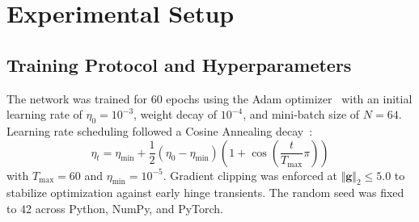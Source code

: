\documentclass[conference]{IEEEtran}
\begin{document}
\section{Experimental Setup}

\subsection{Training Protocol and Hyperparameters}
The network was trained for 60 epochs using the Adam optimizer~\cite{kingma2014adam} with an initial learning rate of $\eta_0 = 10^{-3}$, weight decay of $10^{-4}$, and mini-batch size of $N=64$. Learning rate scheduling followed a Cosine Annealing decay~\cite{loshchilov2016sgdr}:
\begin{equation}
    \eta_t = \eta_{\min} + \frac{1}{2}(\eta_0 - \eta_{\min})\left(1 + \cos\left(\frac{t}{T_{\max}}\pi\right)\right)
\end{equation}
with $T_{\max} = 60$ and $\eta_{\min} = 10^{-5}$. Gradient clipping was enforced at $\Vert \mathbf{g} \Vert_2 \le 5.0$ to stabilize optimization against early hinge transients. The random seed was fixed to 42 across Python, NumPy, and PyTorch.
\end{document}
